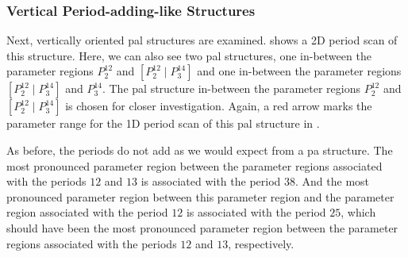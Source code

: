 \subsubsection{Vertical Period-adding-like Structures}

Next, vertically oriented \gls{pal} structures are examined.
 shows a 2D period scan of this structure.
Here, we can also see two \gls{pal} structures, one in-between the parameter regions $P^{12}_2$ and $\left[P^{12}_2 \mid P^{14}_3\right]$ and one in-between the parameter regions $\left[P^{12}_2 \mid P^{14}_3\right]$ and $P^{14}_3$.
The \gls{pal} structure in-between the parameter regions $P^{12}_2$ and $\left[P^{12}_2 \mid P^{14}_3\right]$ is chosen for closer investigation.
Again, a red arrow marks the parameter range for the 1D period scan of this \gls{pal} structure in .

As before, the periods do not add as we would expect from a \gls{pa} structure.
The most pronounced parameter region between the parameter regions associated with the periods $12$ and $13$ is associated with the period $38$.
And the most pronounced parameter region between this parameter region and the parameter region associated with the period $12$ is associated with the period $25$, which should have been the most pronounced parameter region between the parameter regions associated with the periods $12$ and $13$, respectively.

